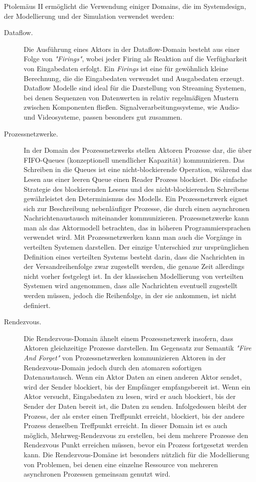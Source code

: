 \begin{description}
	Ptolemäus II ermöglicht die Verwendung einiger Domains, die im  Systemdesign, der Modellierung und der Simulation verwendet werden:
	
	\begin{description} 
		\item[Dataflow.] Die Ausführung eines Aktors in der Dataflow-Domain besteht aus einer Folge von \textit{"Firings"}, wobei jeder Firing als Reaktion auf die Verfügbarkeit von Eingabedaten erfolgt. Ein \textit{Firings} ist eine für gewöhnlich kleine Berechnung, die die Eingabedaten verwendet und Ausgabedaten erzeugt. Dataflow Modelle sind ideal für die Darstellung von Streaming Systemen, bei denen Sequenzen von Datenwerten in relativ regelmäßigen Mustern zwischen Komponenten fließen. Signalverarbeitungssysteme, wie Audio- und Videosysteme, passen besonders gut zusammen.
		
		\item[Prozessnetzwerke.] In der Domain des Prozessnetzwerks stellen Aktoren Prozesse dar, die über FIFO-Queues (konzeptionell unendlicher Kapazität) kommunizieren. Das Schreiben in die Queues ist eine nicht-blockierende Operation, während das Lesen aus einer leeren Queue einen Reader Prozess blockiert. Die einfache Strategie des blockierenden Lesens und des nicht-blockierenden Schreibens gewährleistet den Determinismus des Modells. Ein Prozessnetzwerk eignet sich zur Beschreibung nebenläufiger Prozesse, die durch einen asynchronen Nachrichtenaustausch miteinander kommunizieren. Prozessnetzwerke kann man als das Aktormodell betrachten, das in höheren Programmiersprachen verwendet wird. Mit Prozessnetzwerken kann man auch die Vorgänge in verteilten Systemen darstellen. Der einzige Unterschied zur ursprünglichen Definition eines verteilten Systems besteht darin, dass die Nachrichten in der Versandreihenfolge zwar zugestellt werden, die genaue Zeit allerdings nicht vorher festgelegt ist. In der klassischen Modellierung von verteilten Systemen wird angenommen, dass alle Nachrichten eventuell zugestellt werden müssen, jedoch die Reihenfolge, in der sie ankommen, ist nicht definiert.
		
		\item[Rendezvous.] Die Rendezvous-Domain ähnelt einem Prozessnetzwerk insofern, dass Aktoren gleichzeitige Prozesse darstellen. Im Gegensatz zur Semantik \textit{"Fire And Forget"} von Prozessnetzwerken kommunizieren Aktoren in der Rendezvous-Domain jedoch durch den atomaren sofortigen Datenaustausch. Wenn ein Aktor Daten an einen anderen Aktor sendet, wird der Sender blockiert, bis der Empfänger empfangsbereit ist. Wenn ein Aktor versucht, Eingabedaten zu lesen, wird er auch blockiert, bis der Sender der Daten bereit ist, die Daten zu senden. Infolgedessen bleibt der Prozess, der als erster einen Treffpunkt erreicht, blockiert, bis der andere Prozess denselben Treffpunkt erreicht. In dieser Domain ist es auch möglich, Mehrweg-Rendezvous zu erstellen, bei dem mehrere Prozesse den Rendezvous Punkt erreichen müssen, bevor ein Prozess fortgesetzt werden kann. Die Rendezvous-Domäne ist besonders nützlich für die Modellierung von Problemen, bei denen eine einzelne Ressource von mehreren asynchronen Prozessen gemeinsam genutzt wird.
		

\end{description}
\end{description}
